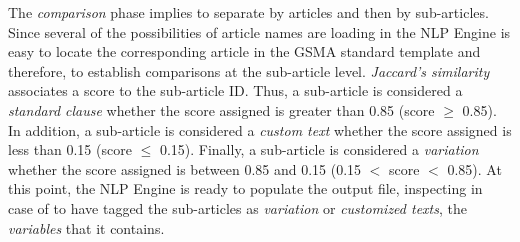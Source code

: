 The \textit{comparison} phase implies to separate by articles and then by sub-articles. Since several of the possibilities of article names are loading in the NLP Engine is easy to locate the corresponding article in the GSMA standard template and therefore, to establish comparisons at the sub-article level. \textit{Jaccard's similarity} associates a score to the sub-article ID. Thus, a sub-article is considered a \textit{standard clause} whether the score assigned is greater than 0.85 (score $\geq$ 0.85). In addition, a sub-article is considered a \textit{custom text} whether the score assigned is less than 0.15 (score $\leq$ 0.15). Finally, a sub-article is considered a \textit{variation} whether the score assigned is between 0.85 and 0.15 (0.15 $<$ score $<$ 0.85). At this point, the NLP Engine is ready to populate the output file, inspecting in case of to have tagged the sub-articles as \textit{variation} or \textit{customized texts}, the \textit{variables} that it contains.